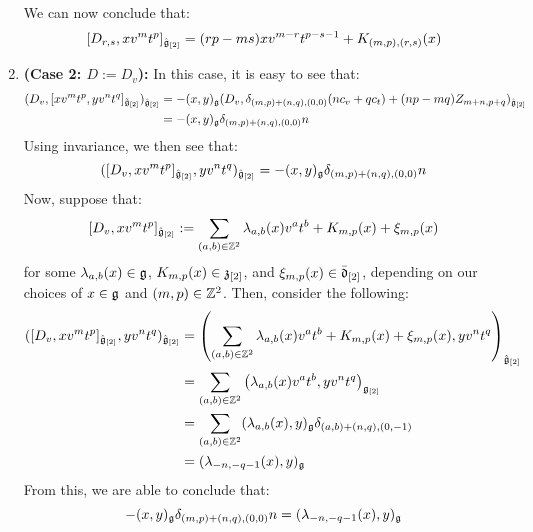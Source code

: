 \begin{remark}
\begin{enumerate}
                    We can now conclude that:
                        $$[D_{r, s}, x v^m t^p]_{\hat{\mathfrak{g}}_{[2]}} = ( rp - ms ) x v^{m - r} t^{p - s - 1} + K_{(m, p), (r, s)}(x)$$
                    \item \textbf{(Case 2: $D := D_v$):} In this case, it is easy to see that:
                        $$
                            \begin{aligned}
                                ( D_v, [x v^m t^p, y v^n t^q]_{\tilde{\mathfrak{g}}_{[2]}} )_{\hat{\mathfrak{g}}_{[2]}} & = -(x, y)_{\mathfrak{g}} ( D_v, \delta_{(m, p) + (n, q), (0, 0)} ( n c_v + q c_t ) + (np - mq) Z_{m + n, p + q} )_{\hat{\mathfrak{g}}_{[2]}}
                                \\
                                & = -(x, y)_{\mathfrak{g}} \delta_{(m, p) + (n, q), (0, 0)} n
                            \end{aligned}
                        $$
                    Using invariance, we then see that:
                        $$( [D_v, x v^m t^p]_{\hat{\mathfrak{g}}_{[2]}}, y v^n t^q )_{\hat{\mathfrak{g}}_{[2]}} = -(x, y)_{\mathfrak{g}} \delta_{(m, p) + (n, q), (0, 0)} n$$
                    Now, suppose that:
                        $$[D_v, x v^m t^p]_{\hat{\mathfrak{g}}_{[2]}} := \sum_{(a, b) \in \mathbb{Z}^2} \lambda_{a, b}(x) v^a t^b + K_{m, p}(x) + \xi_{m, p}(x)$$
                    for some $\lambda_{a, b}(x) \in \mathfrak{g}$, $K_{m, p}(x) \in \mathfrak{z}_{[2]}$, and $\xi_{m, p}(x) \in \bar{\mathfrak{d}}_{[2]}$, depending on our choices of $x \in \mathfrak{g}$ and $(m, p) \in \mathbb{Z}^2$. Then, consider the following:
                        $$
                            \begin{aligned}
                                ( [D_v, x v^m t^p]_{\hat{\mathfrak{g}}_{[2]}}, y v^n t^q )_{\hat{\mathfrak{g}}_{[2]}} & = \left( \sum_{(a, b) \in \mathbb{Z}^2} \lambda_{a, b}(x) v^a t^b + K_{m, p}(x) + \xi_{m, p}(x), y v^n t^q \right)_{\hat{\mathfrak{g}}_{[2]}}
                                \\
                                & = \sum_{(a, b) \in \mathbb{Z}^2} \left( \lambda_{a, b}(x) v^a t^b, y v^n t^q \right)_{\mathfrak{g}_{[2]}}
                                \\
                                & = \sum_{(a, b) \in \mathbb{Z}^2} (\lambda_{a, b}(x), y)_{\mathfrak{g}} \delta_{ (a, b) + (n, q), (0, -1) }
                                \\
                                & = (\lambda_{-n, -q - 1}(x), y)_{\mathfrak{g}}
                            \end{aligned}
                        $$
                    From this, we are able to conclude that:
                        $$-(x, y)_{\mathfrak{g}} \delta_{(m, p) + (n, q), (0, 0)} n = (\lambda_{-n, -q - 1}(x), y)_{\mathfrak{g}}$$

\end{enumerate}
\end{remark}
